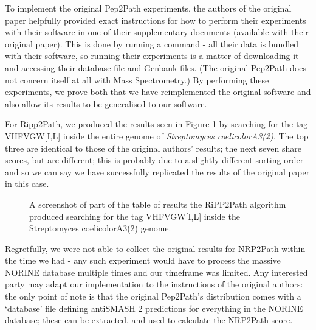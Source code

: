 \documentclass{l4proj}
\begin{document}
To implement the original Pep2Path experiments, the authors of the original paper helpfully provided exact instructions for how to perform their experiments with their software in one of their supplementary documents (available with their original paper). This is done by running a command - all their data is bundled with their software, so running their experiments is a matter of downloading it and accessing their database file and Genbank files. (The original Pep2Path does not concern itself at all with Mass Spectrometry.) By performing these experiments, we prove both that we have reimplemented the original software and also allow its results to be generalised to our software.

For Ripp2Path, we produced the results seen in Figure \ref{fig:ripp2path} by searching for the tag VHFVGW[I,L] inside the entire genome of \textit{Streptomyces coelicolorA3(2)}. The top three are identical to those of the original authors' results; the next seven share scores, but are different; this is probably due to a slightly different sorting order and so we can say we have successfully replicated the results of the original paper in this case.

\begin{figure} \label{fig:ripp2path}
    \centering

    \caption{A screenshot of part of the  table of results the RiPP2Path algorithm produced searching for the tag VHFVGW[I,L] inside the Streptomyces coelicolorA3(2) genome.}

    \label{fig:ripp2path}
\end{figure}

Regretfully, we were not able to collect the original results for NRP2Path within the time we had - any such experiment would have to process the massive NORINE database multiple times and our timeframe was limited. Any interested party may adapt our implementation to the instructions of the original authors: the only point of note is that the original Pep2Path's distribution comes with a `database' file defining antiSMASH 2 predictions for everything in the NORINE database; these can be extracted, and used to calculate the NRP2Path score. 
\end{document}
